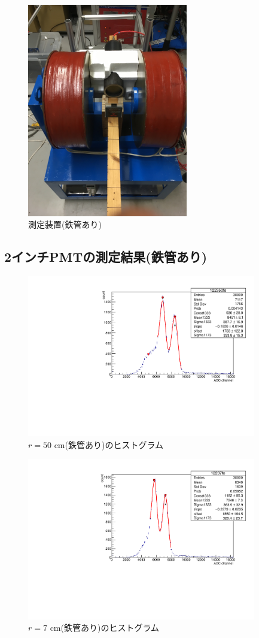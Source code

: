 \begin{figure}[h]
	\centering
		\includegraphics[width=7cm]{fig/iguchi/2inchinFe.jpg}
	\caption{測定装置(鉄管あり)}
	\label{2inchinFe}
\end{figure}


\subsection{2インチPMTの測定結果(鉄管あり)}

\begin{figure}[h]
	\centering
		\includegraphics[clip,angle=-90,width=10cm]{fig/iguchi/122350fe.pdf}
	\caption{$r=50$ cm(鉄管あり)のヒストグラム}
	\label{hist50fe}
\end{figure}
\begin{figure}[h]
	\centering
		\includegraphics[clip,angle=-90,width=10cm]{fig/iguchi/12237fe.pdf}
	\caption{$r=7$ cm(鉄管あり)のヒストグラム}
	\label{hist7fe}
\end{figure}

